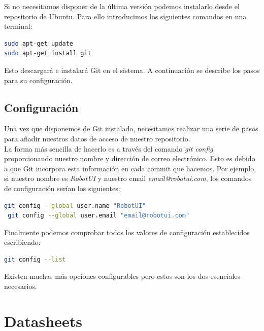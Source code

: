 \begin{appendix}
Si no necesitamos disponer de la última versión podemos instalarlo desde el repositorio de Ubuntu. Para ello introducimos los siguientes comandos en una terminal:\\

\begin{lstlisting}[language=bash]
sudo apt-get update
sudo apt-get install git
\end{lstlisting}

Esto descargará e instalará Git en el sistema. A continuación se describe los pasos para su configuración.

\subsection{Configuración}

Una vez que disponemos de Git instalado, necesitamos realizar una serie de pasos para añadir nuestros datos de acceso de nuestro repositorio.\\

La forma más sencilla de hacerlo es a través del comando \emph{git config} proporcionando nuestro nombre y dirección de correo electrónico. Esto es debido a que Git incorpora esta información en cada commit
que hacemos. Por ejemplo, si nuestro nombre es \emph{RobotUI} y nuestro email \emph{email@robotui.com}, los comandos de configuración serían los siguientes:\\

\begin{lstlisting}[language=bash]
 git config --global user.name "RobotUI"
 git config --global user.email "email@robotui.com"
\end{lstlisting}

Finalmente podemos comprobar todos los valores de configuración establecidos escribiendo:\\

\begin{lstlisting}[language=bash]
git config --list
\end{lstlisting}

Existen muchas más opciones configurables pero estos son los dos esenciales necesarios.\\


\section{Datasheets}

\end{appendix}





